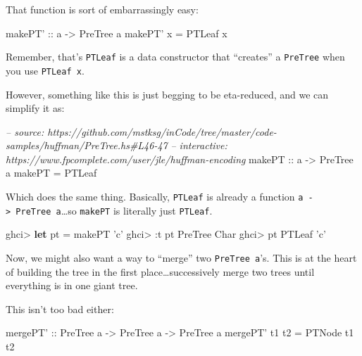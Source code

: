 \documentclass[]{article}
\newenvironment{Shaded}{}{}
\newcommand{\KeywordTok}[1]{\textcolor[rgb]{0.00,0.44,0.13}{\textbf{{#1}}}}
\newcommand{\DataTypeTok}[1]{\textcolor[rgb]{0.56,0.13,0.00}{{#1}}}
\newcommand{\CharTok}[1]{\textcolor[rgb]{0.25,0.44,0.63}{{#1}}}
\newcommand{\CommentTok}[1]{\textcolor[rgb]{0.38,0.63,0.69}{\textit{{#1}}}}
\newcommand{\OtherTok}[1]{\textcolor[rgb]{0.00,0.44,0.13}{{#1}}}
\newcommand{\FunctionTok}[1]{\textcolor[rgb]{0.02,0.16,0.49}{{#1}}}
\newcommand{\NormalTok}[1]{{#1}}
\begin{document}
That function is sort of embarrassingly easy:

\begin{Shaded}
\begin{Highlighting}[]
\OtherTok{makePT' ::} \NormalTok{a }\OtherTok{->} \DataTypeTok{PreTree} \NormalTok{a}
\NormalTok{makePT' x }\FunctionTok{=} \DataTypeTok{PTLeaf} \NormalTok{x}
\end{Highlighting}
\end{Shaded}

Remember, that's \texttt{PTLeaf} is a data constructor that ``creates''
a \texttt{PreTree} when you use \texttt{PTLeaf\ x}.

However, something like this is just begging to be eta-reduced, and we
can simplify it as:

\begin{Shaded}
\begin{Highlighting}[]
\CommentTok{-- source: https://github.com/mstksg/inCode/tree/master/code-samples/huffman/PreTree.hs#L46-47}
\CommentTok{-- interactive: https://www.fpcomplete.com/user/jle/huffman-encoding}
\OtherTok{makePT ::} \NormalTok{a }\OtherTok{->} \DataTypeTok{PreTree} \NormalTok{a}
\NormalTok{makePT }\FunctionTok{=} \DataTypeTok{PTLeaf}
\end{Highlighting}
\end{Shaded}

Which does the same thing. Basically, \texttt{PTLeaf} is already a
function \texttt{a\ -\textgreater{}\ PreTree\ a}\ldots{}so
\texttt{makePT} is literally just \texttt{PTLeaf}.

\begin{Shaded}
\begin{Highlighting}[]
\NormalTok{ghci}\FunctionTok{>} \KeywordTok{let} \NormalTok{pt }\FunctionTok{=} \NormalTok{makePT }\CharTok{'c'}
\NormalTok{ghci}\FunctionTok{>} \FunctionTok{:}\NormalTok{t pt}
\DataTypeTok{PreTree} \DataTypeTok{Char}
\NormalTok{ghci}\FunctionTok{>} \NormalTok{pt}
\DataTypeTok{PTLeaf} \CharTok{'c'}
\end{Highlighting}
\end{Shaded}

Now, we might also want a way to ``merge'' two \texttt{PreTree\ a}'s.
This is at the heart of building the tree in the first
place\ldots{}successively merge two trees until everything is in one
giant tree.

This isn't too bad either:

\begin{Shaded}
\begin{Highlighting}[]
\OtherTok{mergePT' ::} \DataTypeTok{PreTree} \NormalTok{a }\OtherTok{->} \DataTypeTok{PreTree} \NormalTok{a }\OtherTok{->} \DataTypeTok{PreTree} \NormalTok{a}
\NormalTok{mergePT' t1 t2 }\FunctionTok{=} \DataTypeTok{PTNode} \NormalTok{t1 t2}
\end{Highlighting}
\end{Shaded}
\end{document}
